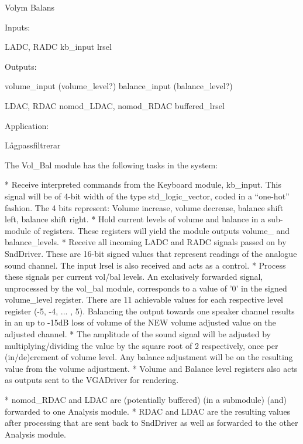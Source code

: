 Volym Balans

Inputs:

LADC, RADC
kb\_input
lrsel

Outputs:

volume\_input (volume\_level?)
balance\_input (balance\_level?)

LDAC, RDAC
nomod\_LDAC, nomod\_RDAC
buffered\_lrsel



Application:

Lågpassfiltrerar



The Vol\_Bal module has the following tasks in the system:

 * Receive interpreted commands from the Keyboard module, kb\_input. This signal
will be of 4-bit width of the type std\_logic\_vector, coded in a ``one-hot'' fashion. The 4 bits represent: Volume increase, volume decrease, balance shift left, balance shift right. 
 * Hold current levels of volume and balance in a sub-module of registers. These registers will yield the module outputs volume\_ and balance\_levels.
 * Receive all incoming LADC and RADC signals passed on by SndDriver. These are 16-bit signed values that represent readings of the analogue sound channel. The input lrsel is also received and acts as a control.
 * Process these signals per current vol/bal levels. An exclusively forwarded signal, unprocessed by the vol\_bal module, corresponds to a value of '0' in the signed volume\_level register. There are 11 achievable values for each respective level register (-5, -4, ... , 5). Balancing the output towards one speaker channel results in an up to -15dB loss of volume of the NEW volume adjusted value on the adjusted channel.
 * The amplitude of the sound signal will be adjusted by multiplying/dividing the value by the square root of 2 respectively, once per (in/de)crement of volume level. Any balance adjustment will be on the resulting value from the volume adjustment.
 * Volume and Balance level registers also acts as outputs sent to the VGADriver for rendering.

 * nomod\_RDAC and LDAC are (potentially buffered) (in a submodule) (and) forwarded to one Analysis module.
 * RDAC and LDAC are the resulting values after processing that are sent back to SndDriver as well as forwarded to the other Analysis module.

